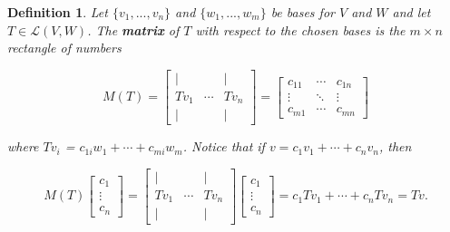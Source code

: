\documentclass{article}
\theoremstyle{colontheorem}
\newtheorem{definition}[theorem]{Definition}
\newenvironment{Def}
{
	\begin{mdframed}[backgroundcolor=DefGreen!10]
	\begin{definition}
}
{
	\end{definition}
	\end{mdframed}
	
	\vspace{.15in}
}
\begin{document}
\begin{Def}
	
	Let $\{v_1, ..., v_n\}$ and $\{w_1, ..., w_m\}$ be bases for $V$ and $W$ and let $T \in \mathcal{L}(V,W)$. The \textbf{matrix} of $T$ with respect to the chosen bases is the $m \times n$ rectangle of numbers
	
	$$
	M(T) = \begin{bmatrix}
	
	| &   & |\\
	Tv_1 & \cdots & Tv_n\\
	| &   & |
	
	\end{bmatrix} = \begin{bmatrix}
		
		c_{11} & \cdots & c_{1n}\\
		\vdots & \ddots & \vdots\\
		c_{m1} & \cdots & c_{mn}
		
	\end{bmatrix}
	$$
	
	where $Tv_i$ = $c_{1i} w_1 + \cdots + c_{mi} w_m$. Notice that if $v = c_1 v_1 + \cdots + c_n v_n$, then
	
	$$
	M(T) \begin{bmatrix}
	
		c_1\\
		\vdots\\
		c_n
	
	\end{bmatrix} = \begin{bmatrix}
	
	| &   & |\\
	Tv_1 & \cdots & Tv_n\\
	| &   & |
	
	\end{bmatrix} \begin{bmatrix}
	
	c_1\\
	\vdots\\
	c_n
	
	\end{bmatrix} = c_1 Tv_1 + \cdots + c_n Tv_n = Tv.
	$$
	
\end{Def}
\end{document}
